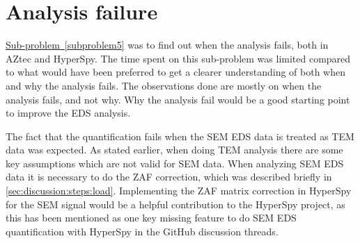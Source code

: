 







%
%




%
%
\section{Analysis failure}
\label{sec:discussion:failure}
\hyperref[subproblem5]{Sub-problem~\ref*{subproblem5}} was to find out when the analysis fails, both in AZtec and HyperSpy.
The time spent on this sub-problem was limited compared to what would have been preferred to get a clearer understanding of both when and why the analysis fails.
The observations done are mostly on when the analysis fails, and not why.
Why the analysis fail would be a good starting point to improve the EDS analysis.

The fact that the quantification fails when the SEM EDS data is treated as TEM data was expected.
As stated earlier, when doing TEM analysis there are some key assumptions which are not valid for SEM data.
When analyzing SEM EDS data it is necessary to do the ZAF correction, which was described briefly in \cref{sec:discussion:steps:load}.
Implementing the ZAF matrix correction in HyperSpy for the SEM signal would be a helpful contribution to the HyperSpy project, as this has been mentioned as one key missing feature to do SEM EDS quantification with HyperSpy in the GitHub discussion threads.




